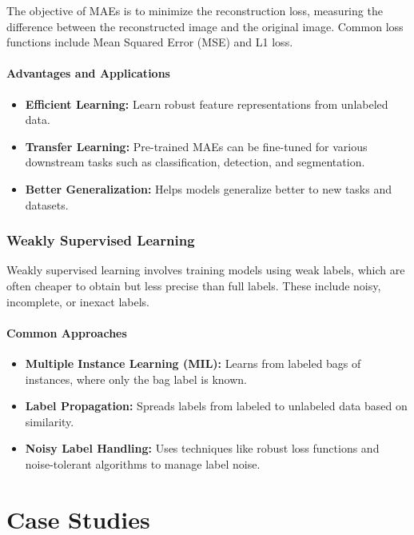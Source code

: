 \documentclass[12pt]{article}
\begin{document}
The objective of MAEs is to minimize the reconstruction loss, measuring the difference between the reconstructed image and the original image. Common loss functions include Mean Squared Error (MSE) and L1 loss.

\paragraph{Advantages and Applications}

\begin{itemize}
    \item \textbf{Efficient Learning:} Learn robust feature representations from unlabeled data.
    \item \textbf{Transfer Learning:} Pre-trained MAEs can be fine-tuned for various downstream tasks such as classification, detection, and segmentation.
    \item \textbf{Better Generalization:} Helps models generalize better to new tasks and datasets.
\end{itemize}

\subsubsection{Weakly Supervised Learning}

Weakly supervised learning involves training models using weak labels, which are often cheaper to obtain but less precise than full labels. These include noisy, incomplete, or inexact labels.

\paragraph{Common Approaches}

\begin{itemize}
    \item \textbf{Multiple Instance Learning (MIL):} Learns from labeled bags of instances, where only the bag label is known.
    \item \textbf{Label Propagation:} Spreads labels from labeled to unlabeled data based on similarity.
    \item \textbf{Noisy Label Handling:} Uses techniques like robust loss functions and noise-tolerant algorithms to manage label noise.
\end{itemize}

\section{Case Studies}
\end{document}
